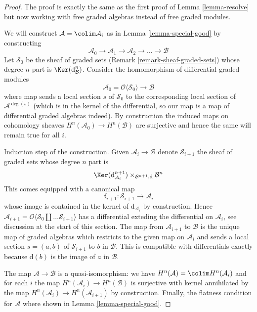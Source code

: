 \begin{proof}
The proof is exactly the same as the first proof of
Lemma \ref{lemma-resolve} but now working with free graded
algebras instead of free graded modules.

\medskip\noindent
We will construct $\mathcal{A} = \colim \mathcal{A}_i$ as in
Lemma \ref{lemma-special-good} by constructing
$$
\mathcal{A}_0 \to \mathcal{A}_1 \to \mathcal{A}_2 \to \ldots \to \mathcal{B}
$$
Let $\mathcal{S}_0$ be the sheaf of graded sets
(Remark \ref{remark-sheaf-graded-sets})
whose degree $n$ part is $\Ker(\text{d}_\mathcal{B}^n)$.
Consider the homomorphism of differential
graded modules
$$
\mathcal{A}_0 = \mathcal{O}\langle \mathcal{S}_0 \rangle
\longrightarrow
\mathcal{B}
$$
where map sends a local section $s$ of $\mathcal{S}_0$
to the corresponding local section of $\mathcal{A}^{\deg(s)}$
(which is in the kernel of the differential, so our map is
a map of differential graded algebras indeed). By construction the
induced maps on cohomology sheaves $H^n(\mathcal{A}_0) \to H^n(\mathcal{B})$
are surjective and hence the same will remain true for all $i$.

\medskip\noindent
Induction step of the construction. Given $\mathcal{A}_i \to \mathcal{B}$
denote $\mathcal{S}_{i + 1}$ the sheaf of graded sets whose degree $n$ part is
$$
\Ker(\text{d}_{\mathcal{A}_i}^{n + 1})
\times_{\mathcal{B}^{n + 1}, \text{d}}
\mathcal{B}^n
$$
This comes equipped with a canonical map
$$
\delta_{i + 1} : \mathcal{S}_{i + 1} \longrightarrow
\mathcal{A}_i
$$
whose image is contained in the kernel of $\text{d}_{\mathcal{A}_i}$
by construction. Hence $\mathcal{A}_{i + 1} = \mathcal{O}\langle
\mathcal{S}_0 \amalg \ldots \mathcal{S}_{i + 1}\rangle$ has a differential
exteding the differential on $\mathcal{A}_i$, see discussion at the
start of this section. The map from $\mathcal{A}_{i + 1}$ to
$\mathcal{B}$ is the unique map of graded algebras which
restricts to the given map on $\mathcal{A}_i$ and sends
a local section $s = (a, b)$ of $\mathcal{S}_{i + 1}$
to $b$ in $\mathcal{B}$. This is compatible with differentials
exactly because $\text{d}(b)$ is the image of $a$ in $\mathcal{B}$.

\medskip\noindent
The map $\mathcal{A} \to \mathcal{B}$ is a quasi-isomorphism:
we have $H^n(\mathcal{A}) = \colim H^n(\mathcal{A}_i)$
and for each $i$ the map $H^n(\mathcal{A}_i) \to H^n(\mathcal{B})$
is surjective with kernel annihilated by the map
$H^n(\mathcal{A}_i) \to H^n(\mathcal{A}_{i + 1})$ by construction.
Finally, the flatness condition for $\mathcal{A}$ where shown in
Lemma \ref{lemma-special-good}.
\end{proof}






